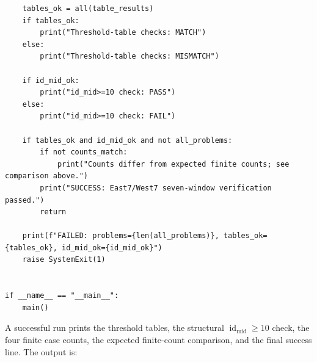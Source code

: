 \documentclass[11pt]{article}
\theoremstyle{plain}
\theoremstyle{definition}
\theoremstyle{remark}
\begin{document}
\begin{lstlisting}
    tables_ok = all(table_results)
    if tables_ok:
        print("Threshold-table checks: MATCH")
    else:
        print("Threshold-table checks: MISMATCH")

    if id_mid_ok:
        print("id_mid>=10 check: PASS")
    else:
        print("id_mid>=10 check: FAIL")

    if tables_ok and id_mid_ok and not all_problems:
        if not counts_match:
            print("Counts differ from expected finite counts; see comparison above.")
        print("SUCCESS: East7/West7 seven-window verification passed.")
        return

    print(f"FAILED: problems={len(all_problems)}, tables_ok={tables_ok}, id_mid_ok={id_mid_ok}")
    raise SystemExit(1)


if __name__ == "__main__":
    main()

\end{lstlisting}
A successful run prints the threshold tables, the structural
\(\operatorname{id}_{\mathrm{mid}}\ge10\) check, the four finite case counts, the
expected finite-count comparison, and the final success line.  The output
is:
\end{document}
